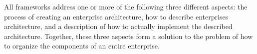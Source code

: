 All frameworks address one or more of the following three different aspects: the process of creating an enterprise architecture, how to describe enterprises architecture, and a description of how to actually implement the described architecture. Together, these three aspects form a solution to the problem of how to organize the components of an entire enterprise.


